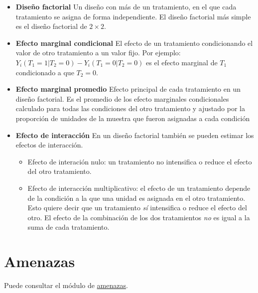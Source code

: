 \documentclass[
  12pt,
  spanish,
]{book}
\providecommand{\tightlist}{%
  \setlength{\itemsep}{0pt}\setlength{\parskip}{0pt}}
\begin{document}
\begin{itemize}
\item
  \textbf{Diseño factorial} Un diseño con más de un tratamiento, en el que cada tratamiento se asigna de forma independiente. El diseño factorial más simple es el diseño factorial de \(2\times 2\).
\item
  \textbf{Efecto marginal condicional} El efecto de un tratamiento condicionando el valor de otro tratamiento a un valor fijo. Por ejemplo:
  \(Y_i(T_1=1|T_2=0)-Y_i(T_1=0|T_2=0)\) es el efecto marginal de \(T_1\) condicionado a que \(T_2=0\).
\item
  \textbf{Efecto marginal promedio} Efecto principal de cada tratamiento en un diseño factorial. Es el promedio de los efecto marginales condicionales
  calculado para todas las condiciones del otro tratamiento y ajustado por la proporción de unidades de la muestra que fueron asignadas a cada condición
\item
  \textbf{Efecto de interacción} En un diseño factorial también se pueden estimar los efectos de interacción.

  \begin{itemize}
  \tightlist
  \item
    Efecto de interación nulo: un tratamiento no intensifica o reduce el efecto del otro tratamiento.
  \item
    Efecto de interacción multiplicativo: el efecto de un tratamiento depende de la condición a la que una unidad es asignada en el otro tratamiento. Esto quiere decir que un tratamiento \emph{sí} intensifica o reduce el efecto del otro. El efecto de la combinación de los dos tratamientos \emph{no} es igual a la suma de cada tratamiento.
  \end{itemize}
\end{itemize}

\hypertarget{amenazas}{%
\section{Amenazas}\label{amenazas}}

Puede consultar el módulo de \href{amenazas-a-la-validez-interna-de-los-experimentos-aleatorios.html}{amenazas}.
\end{document}

